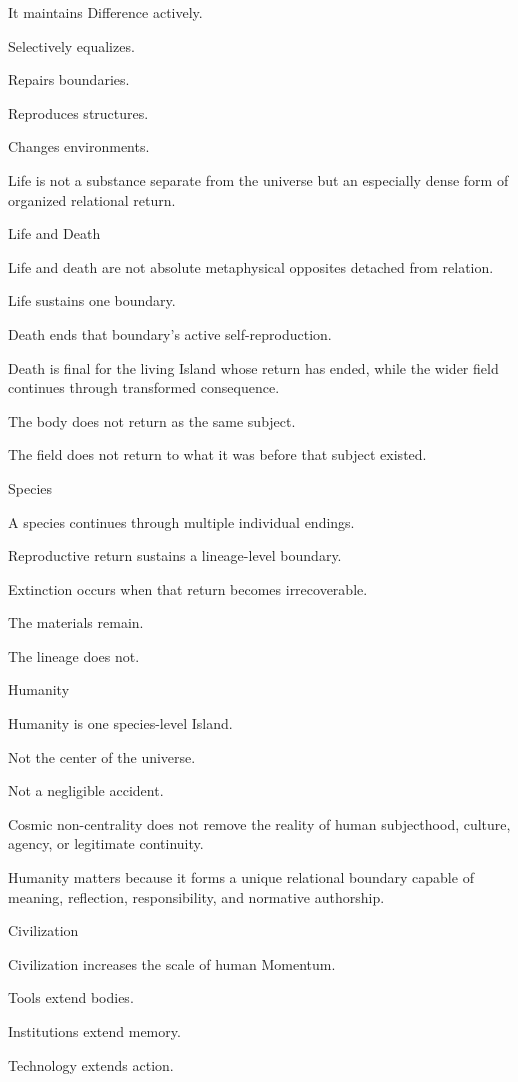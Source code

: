 It maintains Difference actively.

Selectively equalizes.

Repairs boundaries.

Reproduces structures.

Changes environments.

Life is not a substance separate from the universe but an especially dense form of organized relational return.

Life and Death

Life and death are not absolute metaphysical opposites detached from relation.

Life sustains one boundary.

Death ends that boundary’s active self-reproduction.

Death is final for the living Island whose return has ended, while the wider field continues through transformed consequence.

The body does not return as the same subject.

The field does not return to what it was before that subject existed.

Species

A species continues through multiple individual endings.

Reproductive return sustains a lineage-level boundary.

Extinction occurs when that return becomes irrecoverable.

The materials remain.

The lineage does not.

Humanity

Humanity is one species-level Island.

Not the center of the universe.

Not a negligible accident.

Cosmic non-centrality does not remove the reality of human subjecthood, culture, agency, or legitimate continuity.

Humanity matters because it forms a unique relational boundary capable of meaning, reflection, responsibility, and normative authorship.

Civilization

Civilization increases the scale of human Momentum.

Tools extend bodies.

Institutions extend memory.

Technology extends action.

